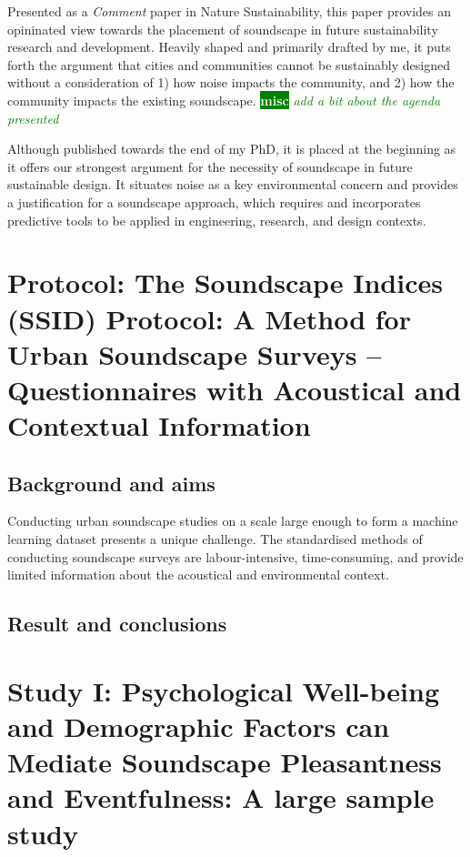 \documentclass[twoside,fontsize=12pt,titlepage]{scrbook}
\newcommand{\remark}[3]{%
    {\colorbox{#2}{\sffamily\scriptsize\bfseries\textcolor{white}{#1}}}
    {\sffamily\small\itshape\textcolor{#2}{#3}}
}
\newcommand{\misc}[1]{\remark{misc}{green}{#1}}
\begin{document}
       Presented as a \textit{Comment} paper in Nature Sustainability, this paper provides an opininated view towards the placement of soundscape in future sustainability research and development. Heavily shaped and primarily drafted by me, it puts forth the argument that cities and communities cannot be sustainably designed without a consideration of 1) how noise impacts the community, and 2) how the community impacts the existing soundscape. \misc{add a bit about the agenda presented}

       Although published towards the end of my PhD, it is placed at the beginning as it offers our strongest argument for the necessity of soundscape in future sustainable design. It situates noise as a key environmental concern and provides a justification for a soundscape approach, which requires and incorporates predictive tools to be applied in engineering, research, and design contexts.


       \newpage
\section{\label{pap:prot}Protocol: The Soundscape Indices (SSID) Protocol: A Method for Urban Soundscape Surveys -- Questionnaires with Acoustical and Contextual Information}

 \subsection*{Background and aims}
       Conducting urban soundscape studies on a scale large enough to form a machine learning dataset presents a unique challenge. The standardised methods of conducting soundscape surveys \citep{ISO12913_2_2018IOS} are labour-intensive, time-consuming, and provide limited information about the acoustical and environmental context.

 \subsection*{Result and conclusions}

       



\section{Study I: Psychological Well-being and Demographic Factors can Mediate Soundscape Pleasantness and Eventfulness: A large sample study}
\end{document}
